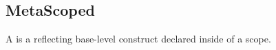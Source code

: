 \subsection{MetaScoped}
\label{concept-MetaScoped}

A  is a  reflecting base-level construct declared
inside of a scope.




